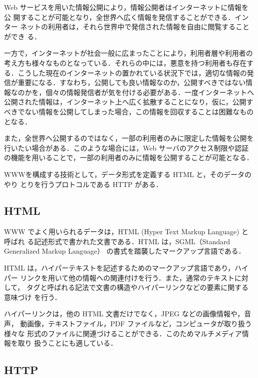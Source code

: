 Web サービスを用いた情報公開により，情報公開者はインターネットに情報を公
開することが可能となり，全世界へ広く情報を発信することができる．インター
ネットの利用者は，それら世界中で発信された情報を自由に閲覧することができ
る．

一方で，インターネットが社会一般に広まったことにより，利用者層や利用者の
考え方も様々なものとなっている．それらの中には，悪意を持つ利用者も存在す
る．こうした現在のインターネットの置かれている状況下では，適切な情報の発
信が重要になる．すなわち，公開しても良い情報なのか，公開すべきではない情
報なのかを，個々の情報発信者が気を付ける必要がある．一度インターネットへ
公開された情報は，インターネット上へ広く拡散することになり，仮に，公開す
べきでない情報を公開してしまった場合，この情報を回収することは困難なもの
となる．

また，全世界へ公開するのではなく，一部の利用者のみに限定した情報を公開を
行いたい場合がある．このような場合には，Web サーバのアクセス制限や認証
の機能を用いることで，一部の利用者のみに情報を公開することが可能となる．

WWWを構成する技術として，データ形式を定義する HTML と，そのデータのやり
とりを行うプロトコルである HTTP がある．

\subsection{HTML}
WWW でよく用いられるデータは，HTML (Hyper Text Markup Language) と呼ばれ
る記述形式で書かれた文書である．HTML は，SGML（Standard Generalized Markup 
Language） の書式を踏襲したマークアップ言語である．

HTML は，ハイパーテキストを記述するためのマークアップ言語であり，ハイパー
リンクを用いて他の情報への関連付けを行う．また，通常のテキストに対して，
タグと呼ばれる記法で文書の構造やハイパーリンクなどの要素に関する意味づけ
を行う．

ハイパーリンクは，他の HTML 文書だけでなく，JPEG などの画像情報や，音声，
動画像，テキストファイル，PDF ファイルなど，コンピュータが取り扱う様々な
形式のファイルに関連づけることができる．このためマルチメディア情報を取り
扱うことにも適している．

\subsection{HTTP}


